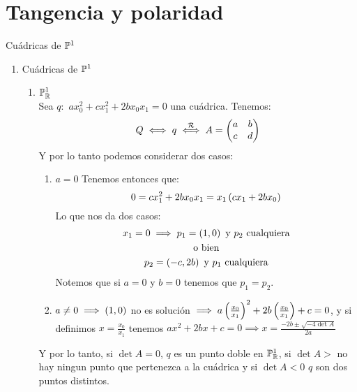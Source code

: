 \section{Tangencia y polaridad}

\begin{example} Cuádricas de $\mathbb{P}^1$
  \begin{enumerate}
   \item Cuádricas de $\mathbb{P}^1$
   \begin{enumerate}
      \item $\mathbb{P}^1_{\mathbb{R}}$\\
      Sea $q:$ $ax^{2}_{0} + cx^{2}_{1}+2bx_0x_1=0$ una cuádrica. Tenemos:
      \[
	Q \iff q \stackrel{\mathcal{R}}{\iff}A=
      \begin{pmatrix}
	a & b\\
	c & d\\
      \end{pmatrix}
      \]
      Y por lo tanto podemos considerar dos casos:
      \begin{enumerate}
	\item $a=0$ Tenemos entonces que:
	\[
	  0=cx^{2}_{1}+2bx_0x_1 = x_1 \left( cx_1 +2bx_0 \right) 
	\]
	Lo que nos da dos casos:
	\begin{gather*}
	  x_1=0 \implies p_1=\left( 1,0\right) \text{ y $p_2$ cualquiera}\\
	  \text{o bien}\\
	  p_2=\left( -c,2b\right) \text{ y $p_1$ cualquiera}\\
	\end{gather*}
	Notemos que si $a=0$ y $b=0$ tenemos que $p_1=p_2$.
	
	\item $a\neq 0 \implies \left( 1,0\right)$ no es solución 
	$\implies a\left(\frac{x_0}{x_1}\right) ^2 +2b\left(\frac{x_0}{x_1}\right) +c=0$,
	y si definimos $x=\frac{x_0}{x_1}$ tenemos $ax^2 +2bx+c=0 \implies
	x=\frac{-2b \pm \sqrt{-4\det A}}{2a}$\\
      \end{enumerate}
      Y por lo tanto, si $\det A = 0$, $q$ es un punto doble en $\mathbb{P}^1_{\mathbb{R}}$,
      si $\det A>$ no hay ningun punto que pertenezca a la cuádrica y si 
      $\det A <0$ $q$ son dos puntos distintos.
      

\end{enumerate}
\end{enumerate}
\end{example}

